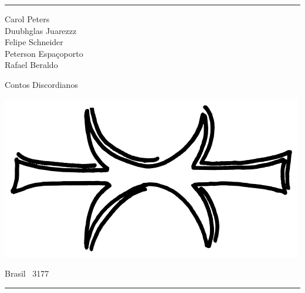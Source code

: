 \thispagestyle{empty}

\hrule

\begin{center}
{\scriptsize
Carol Peters\\
Duubhglas Juarezzz\\
Felipe Schneider\\
Peterson Espaçoporto\\
Rafael Beraldo\\
}
\vspace{.5cm}

{\Large Contos Discordianos}

\vspace{2cm}

\includegraphics[scale=.35]{img/eris_hand}

\vfill

Brasil \textperiodcentered\ 3177
\vspace{.5em}
\hrule

\end{center}
\newpage

